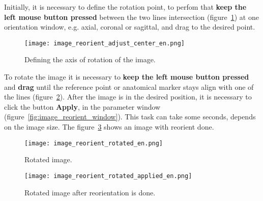 Initially, it is necessary to define the rotation point, to perfom that \textbf{keep the left mouse button pressed} between the two lines intersection (figure~\ref{fig:image_reorient_adjust_center}) at one orientation window, e.g. axial, coronal or sagittal, and drag to the desired point.

\begin{figure}[!htb]
\centering
\texttt{[image: image\_reorient\_adjust\_center\_en.png]}
\caption{Defining the axis of rotation of the image.}
\label{fig:image_reorient_adjust_center}
\end{figure}

To rotate the image it is necessary to \textbf{keep the left mouse button pressed} and \textbf{drag} until the reference point or anatomical marker stays align with one of the lines (figure~\ref{fig:image_reorient_rotated}). After the image is in the desired position, it is necessary to click the button \textbf{Apply}, in the parameter window (figure~\ref{fig:image_reorient_window}). This task can take some seconds, depends on the image size. The figure~\ref{fig:image_reorient_rotated_applied} shows an image with reorient done.

\begin{figure}[!htb]
\centering
\texttt{[image: image\_reorient\_rotated\_en.png]}
\caption{Rotated image.}
\label{fig:image_reorient_rotated}
\end{figure}

\begin{figure}[!htb]
\centering
\texttt{[image: image\_reorient\_rotated\_applied\_en.png]}
\caption{Rotated image after reorientation is done.}
\label{fig:image_reorient_rotated_applied}
\end{figure}

